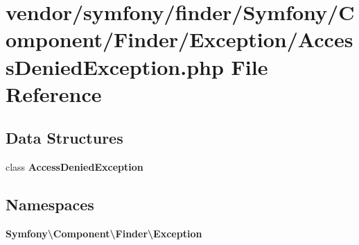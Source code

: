 \section{vendor/symfony/finder/\+Symfony/\+Component/\+Finder/\+Exception/\+Access\+Denied\+Exception.php File Reference}
\label{finder_2_symfony_2_component_2_finder_2_exception_2_access_denied_exception_8php}
\subsection*{Data Structures}
\begin{DoxyCompactItemize}
\item 
class {\bf Access\+Denied\+Exception}
\end{DoxyCompactItemize}
\subsection*{Namespaces}
\begin{DoxyCompactItemize}
\item 
 {\bf Symfony\textbackslash{}\+Component\textbackslash{}\+Finder\textbackslash{}\+Exception}
\end{DoxyCompactItemize}
